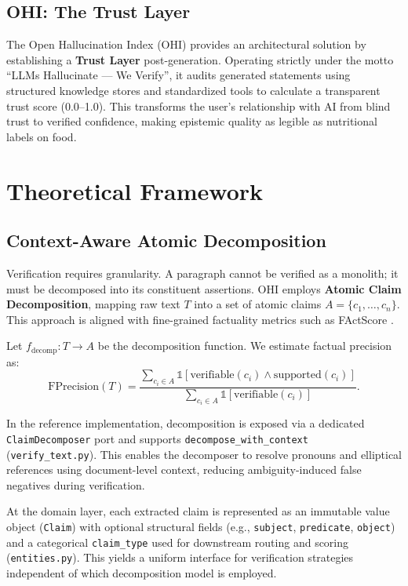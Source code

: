 \documentclass[10pt,a4paper,twocolumn]{article}
\begin{document}
\subsection{OHI: The Trust Layer}
The Open Hallucination Index (OHI) provides an architectural solution by establishing a \textbf{Trust Layer} post-generation. Operating strictly under the motto \enquote{LLMs Hallucinate --- We Verify}, it audits generated statements using structured knowledge stores and standardized tools to calculate a transparent trust score (0.0--1.0). This transforms the user's relationship with AI from blind trust to verified confidence, making epistemic quality as legible as nutritional labels on food.

\section{Theoretical Framework}

\subsection{Context-Aware Atomic Decomposition}
Verification requires granularity. A paragraph cannot be verified as a monolith; it must be decomposed into its constituent assertions. OHI employs \textbf{Atomic Claim Decomposition}, mapping raw text $T$ into a set of atomic claims $A=\{c_1,\dots,c_n\}$. This approach is aligned with fine-grained factuality metrics such as FActScore \cite{min2023factscore}.

Let $f_{\mathrm{decomp}}: T \rightarrow A$ be the decomposition function. We estimate factual precision as:
\begin{equation}
\mathrm{FPrecision}(T) = \frac{\sum_{c_i \in A} \mathbb{1}[\mathrm{verifiable}(c_i)\wedge \mathrm{supported}(c_i)]}{\sum_{c_i \in A} \mathbb{1}[\mathrm{verifiable}(c_i)]}.
\end{equation}

In the reference implementation, decomposition is exposed via a dedicated \texttt{ClaimDecomposer} port and supports \texttt{decompose\_with\_context} (\texttt{verify\_text.py}). This enables the decomposer to resolve pronouns and elliptical references using document-level context, reducing ambiguity-induced false negatives during verification.

At the domain layer, each extracted claim is represented as an immutable value object (\texttt{Claim}) with optional structural fields (e.g., \texttt{subject}, \texttt{predicate}, \texttt{object}) and a categorical \texttt{claim\_type} used for downstream routing and scoring (\texttt{entities.py}). This yields a uniform interface for verification strategies independent of which decomposition model is employed.
\end{document}
